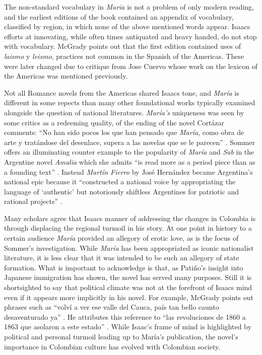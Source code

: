 The non-standard vocabulary in \textit{Maria} is not a problem of only modern reading, and the earliest editions of the book contained an appendix of vocabulary, classified by region, in which none of the above mentioned words appear.
Isaacs efforts at innovating, while often times antiquated and heavy handed, do not stop with vocabulary.
McGrady points out that the first edition contained uses of \textit{laismo} y \textit{leismo}, practices not common in the Spanish of the Americas.
These were later changed due to critique from Jose Cuervo whose work on the lexicon of the Americas was mentioned previously.


Not all Romance novels from the Americas shared Isaacs tone, and \textit{María} is different in some repects than many other foundational works typically examined alongside the question of national literatures.
\textit{María's} uniqueness was seen by some critics as a redeeming quality, of the ending of the novel Cortázar comments: \enquote{No han sido pocos los que han pensado que \textit{María}, como obra de arte y tratándose del desenlace, supera a las novelas que se le parecen} \autocite[57]{Cortazar1908}.
Sommer offers an illuminating counter example to the popularity of \textit{María} and \textit{Sab} in the Argentine novel \textit{Amalia} which she admits \enquote{is read more as a period piece than as a founding text} \autocite[111]{Sommer1991}.
Instead \textit{Martín Fierro} by José Hernández became Argentina's national epic because it \enquote{constructed a national voice by appropriating the language of \enquote{authentic} but notoriously shiftless Argentines for patriotic and rational projects} \autocite[111]{Sommer1991}.


Many scholars agree that Isaacs manner of addressing the changes in Colombia is through displacing the regional turmoil in his story. 
At one point in history to a certain audience \textit{María} provided an allegory of erotic love, as is the focus of Sommer’s investigation. 
While \textit{María} has been appropriated as iconic nationalist literature, it is less clear that it was intended to be such an allegory of state formation.
What is important to acknowledge is that, as Patiño's insight into Japanese immigration has shown, the novel has served many purposes. 
Still it is shortsighted to say that political climate was not at the forefront of Isaacs mind even if it appears more implicitly in his novel.
For example, McGrady points out phrases such as \enquote{volví a ver ese valle del Cauca, país tan bello caunto desaventurado ya} \autocite[314]{McGrady2012}.
He attributes this reference to \enquote{las revoluciones de 1860 a 1863 que asolaron a este estado} \autocite[314]{McGrady2012}.
While Isaac's frame of mind is highlighted by political and personal turmoil leading up to María's publication, the novel's importance in Colombian culture has evolved with Colombian society.


